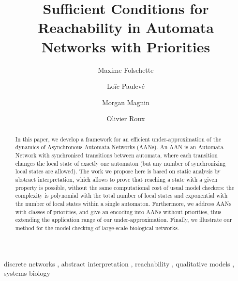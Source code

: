 \documentclass{elsarticle}
\begin{document}
\begin{frontmatter}
\title{Sufficient Conditions for Reachability in Automata Networks with Priorities}

\author[irccyn,unikassel]{Maxime Folschette}
\author[lri]{Loïc Paulevé}
\author[irccyn]{Morgan Magnin}
\author[irccyn]{Olivier Roux}

\address[irccyn]{LUNAM Universit\'e, \'Ecole Centrale de Nantes, IRCCyN UMR CNRS 6597\\
(Institut de Recherche en Communications et Cybern\'etique de Nantes)\\
1 rue de la No\"e - B.P. 92101 - 44321 Nantes Cedex 3, France.}

\address[unikassel]{School of Electrical Engineering and Computer Science,\\
  University of Kassel, Germany}

\address[lri]{CNRS, Laboratoire de Recherche en Informatique (LRI)\\
		Université Paris-Sud - CNRS UMR 8623, France}


\begin{abstract}
In this paper,
we develop a framework for an efficient under-approximation of the dynamics of
Asynchronous Automata Networks (AANs).
An AAN is an Automata Network with synchronised transitions between automata,
where each transition changes the local state of exactly one automaton
(but any number of synchronizing local states are allowed).
The work we propose here
is based on static analysis by abstract interpretation,
which allows to prove that reaching a state with a given property
is possible,
without the same computational cost of usual model checkers:
the complexity is polynomial with the total number of local states and exponential with the number of
local states within a single automaton.
Furthermore, we address AANs with classes of priorities,
and give an encoding into AANs without priorities,
thus extending the application range of our under-approximation.
Finally, we illustrate our method for the model checking of
large-scale biological networks.
\end{abstract}
\begin{keyword}
discrete networks \sep
abstract interpretation \sep
reachability \sep
qualitative models \sep
systems biology
\end{keyword}
\end{frontmatter}




\end{document}
